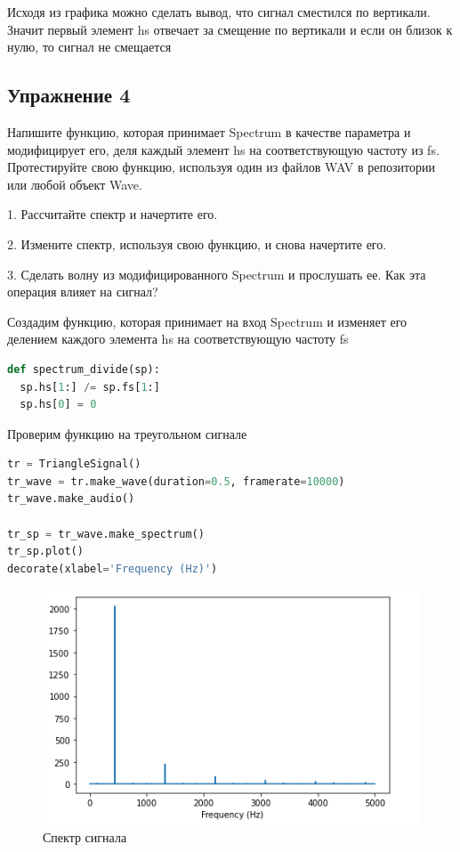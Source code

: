 Исходя из графика можно сделать вывод, что сигнал сместился по вертикали. Значит первый элемент hs отвечает за смещение по вертикали и если он близок к нулю, то сигнал не смещается


\subsection{Упражнение 4}

Напишите функцию, которая принимает Spectrum в качестве параметра и модифицирует его, деля каждый элемент hs на соответствующую частоту из fs. Протестируйте свою функцию, используя один из файлов WAV в репозитории или любой объект Wave.

1. Рассчитайте спектр и начертите его.

2. Измените спектр, используя свою функцию, и снова начертите его.

3. Сделать волну из модифицированного Spectrum и прослушать ее. Как эта операция влияет на сигнал?

Создадим функцию, которая принимает на вход Spectrum и изменяет его делением каждого элемента hs на соответствующую частоту fs

\begin{lstlisting}[language=Python]
def spectrum_divide(sp):
  sp.hs[1:] /= sp.fs[1:]
  sp.hs[0] = 0
\end{lstlisting}

Проверим функцию на треугольном сигнале

\begin{lstlisting}[language=Python]
tr = TriangleSignal()
tr_wave = tr.make_wave(duration=0.5, framerate=10000)
tr_wave.make_audio()

tr_sp = tr_wave.make_spectrum()
tr_sp.plot()
decorate(xlabel='Frequency (Hz)')
\end{lstlisting}

\begin{figure}[H]
	\begin{center}
		\includegraphics[scale=1]{fig/lab02/lab02_10.png}
		\caption{Спектр сигнала}
	\end{center}
\end{figure}

